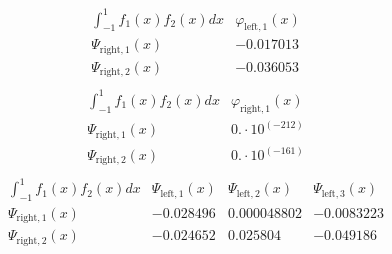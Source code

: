 \documentclass{article}
\begin{document}
\begin{landscape}
$$\begin{array}{l|l}
\int_{-1}^1 f_1(x)f_2(x) dx& \varphi_{\text{left},1}(x) \\ \hline 
 \Psi_{\text{right},1}(x) & -0.017013 \\ 
\Psi_{\text{right},2}(x) & -0.036053 \\ 
\end{array} $$ 
$$ \begin{array}{l|l}
\int_{-1}^1 f_1(x)f_2(x) dx& \varphi_{\text{right},1}(x) \\ \hline 
 \Psi_{\text{right},1}(x) & 0.\cdot 10^{(-212)} \\ 
\Psi_{\text{right},2}(x) & 0.\cdot 10^{(-161)} \\ 
\end{array} $$ 
$$ \begin{array}{l|lll}
\int_{-1}^1 f_1(x)f_2(x) dx& \Psi_{\text{left},1}(x)& \Psi_{\text{left},2}(x)& \Psi_{\text{left},3}(x) \\ \hline 
 \Psi_{\text{right},1}(x) & -0.028496 & 0.000048802 & -0.0083223 \\ 
\Psi_{\text{right},2}(x) & -0.024652 & 0.025804 & -0.049186 \\ 
\end{array} $$ 
\end{landscape}
\end{document}
